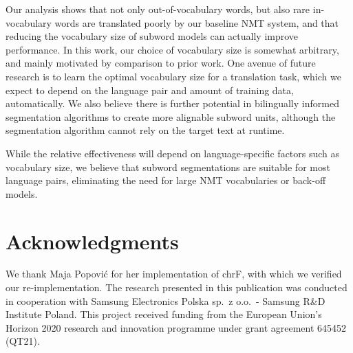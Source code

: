 \documentclass[11pt]{article}
\begin{document}
Our analysis shows that not only out-of-vocabulary words, but also rare in-vocabulary words are translated poorly by our baseline NMT system,
and that reducing the vocabulary size of subword models can actually improve performance.
In this work, our choice of vocabulary size is somewhat arbitrary, and mainly motivated by comparison to prior work.
One avenue of future research is to learn the optimal vocabulary size for a translation task, which we expect to depend on the language pair and amount of training data, automatically.
We also believe there is further potential in bilingually informed segmentation algorithms to create more alignable subword units, although the segmentation algorithm cannot rely on the target text at runtime.

While the relative effectiveness will depend on language-specific factors such as vocabulary size, we believe that subword segmentations are suitable for most language pairs, eliminating the need for large NMT vocabularies or back-off models.


\section*{Acknowledgments}

We thank Maja Popović for her implementation of {\sc chrF}, with which we verified our re-implementation.
The research presented in this publication was conducted in cooperation with Samsung Electronics Polska sp.\ z o.o.\ - Samsung R\&D Institute Poland.
This project received funding from the European Union's Horizon 2020 research and innovation programme under grant agreement 645452 (QT21).




\end{document}
